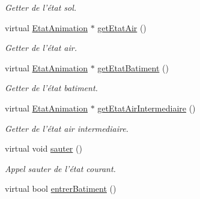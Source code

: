 \begin{DoxyCompactItemize}
\begin{DoxyCompactList}\small\item\em Getter de l'état sol. \end{DoxyCompactList}\item 
\hypertarget{classDecorateurPersonnage_ae925f000f6df682d58bfe231fc2ca1d6}{virtual \hyperlink{classEtatAnimation}{Etat\-Animation} $\ast$ \hyperlink{classDecorateurPersonnage_ae925f000f6df682d58bfe231fc2ca1d6}{get\-Etat\-Air} ()}\label{classDecorateurPersonnage_ae925f000f6df682d58bfe231fc2ca1d6}

\begin{DoxyCompactList}\small\item\em Getter de l'état air. \end{DoxyCompactList}\item 
\hypertarget{classDecorateurPersonnage_aaeffb744c37522843c51c35c4fafdbdb}{virtual \hyperlink{classEtatAnimation}{Etat\-Animation} $\ast$ \hyperlink{classDecorateurPersonnage_aaeffb744c37522843c51c35c4fafdbdb}{get\-Etat\-Batiment} ()}\label{classDecorateurPersonnage_aaeffb744c37522843c51c35c4fafdbdb}

\begin{DoxyCompactList}\small\item\em Getter de l'état batiment. \end{DoxyCompactList}\item 
\hypertarget{classDecorateurPersonnage_a32ff925e357ac9b3638b7e1cc3bc3241}{virtual \hyperlink{classEtatAnimation}{Etat\-Animation} $\ast$ \hyperlink{classDecorateurPersonnage_a32ff925e357ac9b3638b7e1cc3bc3241}{get\-Etat\-Air\-Intermediaire} ()}\label{classDecorateurPersonnage_a32ff925e357ac9b3638b7e1cc3bc3241}

\begin{DoxyCompactList}\small\item\em Getter de l'état air intermediaire. \end{DoxyCompactList}\item 
\hypertarget{classDecorateurPersonnage_a9e9ce099f0e50cdc78024653c5986729}{virtual void \hyperlink{classDecorateurPersonnage_a9e9ce099f0e50cdc78024653c5986729}{sauter} ()}\label{classDecorateurPersonnage_a9e9ce099f0e50cdc78024653c5986729}

\begin{DoxyCompactList}\small\item\em Appel sauter de l'état courant. \end{DoxyCompactList}\item 
\hypertarget{classDecorateurPersonnage_a3cc1d53db9d471636f13e2bbf1a83063}{virtual bool \hyperlink{classDecorateurPersonnage_a3cc1d53db9d471636f13e2bbf1a83063}{entrer\-Batiment} ()}\label{classDecorateurPersonnage_a3cc1d53db9d471636f13e2bbf1a83063}


\end{DoxyCompactItemize}
